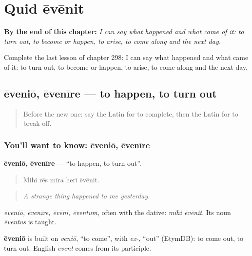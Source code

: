 
\chapter{Quid ēvēnit}
\label{ch:la-quid-evenit}

\begin{chapteropening}
\textbf{By the end of this chapter:} \emph{I can say what happened and what came of it: to turn out, to become or happen, to arise, to come along and the next day.}

Complete the last lesson of chapter 298: I can say what happened and what came of it: to turn out, to become or happen, to arise, to come along and the next day.
\end{chapteropening}

\section[ēveniō, ēvenīre]{ēveniō, ēvenīre — to happen, to turn out}

\label{lesson:LA-C298-evenio}



\begin{quote}
Before the new one: say the Latin for to complete, then the Latin for to break off.
\end{quote}

\subsection*{You'll want to know: ēveniō, ēvenīre}
\textbf{ēveniō, ēvenīre} — \textquotedblleft{}to happen, to turn out\textquotedblright{}.

\begin{quote}
Mihi rēs mīra herī ēvēnit.
\end{quote}

\begin{quote}
\emph{A strange thing happened to me yesterday.}
\end{quote}

\emph{ēveniō, ēvenīre, ēvēnī, ēventum}, often with the dative: \emph{mihi ēvēnit}. Its noun \emph{ēventus} is taught.

\begin{cousinweb}
\textbf{ēveniō} is built on \emph{veniō}, \textquotedblleft{}to come\textquotedblright{}, with \emph{ex-}, \textquotedblleft{}out\textquotedblright{} (EtymDB): to come out, to turn out. English \emph{event} comes from its participle.
\end{cousinweb}


